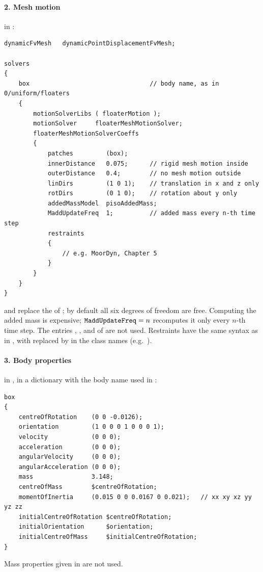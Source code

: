 \paragraph{2. Mesh motion} in :
\begin{lstlisting}[caption={FloatStepper mesh motion (\file{tutorials/floatStepperWaveIsoFoam}).},label={lst:fsdyn}]
dynamicFvMesh   dynamicPointDisplacementFvMesh;

solvers
{
    box                                 // body name, as in 0/uniform/floaters
    {
        motionSolverLibs ( floaterMotion );
        motionSolver     floaterMeshMotionSolver;
        floaterMeshMotionSolverCoeffs
        {
            patches         (box);
            innerDistance   0.075;      // rigid mesh motion inside
            outerDistance   0.4;        // no mesh motion outside
            linDirs         (1 0 1);    // translation in x and z only
            rotDirs         (0 1 0);    // rotation about y only
            addedMassModel  pisoAddedMass;
            MaddUpdateFreq  1;          // added mass every n-th time step
            restraints
            {
                // e.g. MoorDyn, Chapter 5
            }
        }
    }
}
\end{lstlisting}
 and  replace the  of ; by
default all six degrees of freedom are free. Computing the added mass is expensive;
$\texttt{MaddUpdateFreq}=n$ recomputes it only every $n$-th time step. The entries
, ,  and  of
 are not used. Restraints have the same syntax as in
, with  replaced by  in the class
names (e.g.\ ).

\paragraph{3. Body properties} in , in a dictionary with the body
name used in :
\begin{lstlisting}[caption={Body properties, \file{0.orig/uniform/floaters}.}]
box
{
    centreOfRotation    (0 0 -0.0126);
    orientation         (1 0 0 0 1 0 0 0 1);
    velocity            (0 0 0);
    acceleration        (0 0 0);
    angularVelocity     (0 0 0);
    angularAcceleration (0 0 0);
    mass                3.148;
    centreOfMass        $centreOfRotation;
    momentOfInertia     (0.015 0 0 0.0167 0 0.021);   // xx xy xz yy yz zz
    initialCentreOfRotation $centreOfRotation;
    initialOrientation      $orientation;
    initialCentreOfMass     $initialCentreOfRotation;
}
\end{lstlisting}
Mass properties given in  are not used.

